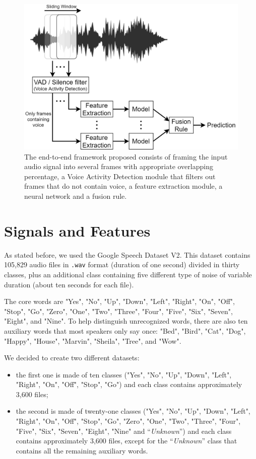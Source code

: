 \documentclass[conference]{IEEEtran}
\begin{document}
\begin{figure}
\centering
\includegraphics[scale=0.23]{End-To-End}
\caption{The end-to-end framework proposed consists of framing the input audio signal into several frames with appropriate overlapping percentage, a Voice Activity Detection module that filters out frames that do not contain voice, a feature extraction module, a neural network and a fusion rule.}
\end{figure}

\section{Signals and Features}
As stated before, we used the Google Speech Dataset V2. This dataset contains 105,829 audio files in \texttt{.wav} format (duration of one second) divided in thirty classes, plus an additional class containing five different type of noise of variable duration (about ten seconds for each file).

The core words are "Yes", "No", "Up", "Down", "Left", "Right", "On", "Off", "Stop", "Go", "Zero", "One", "Two", "Three", "Four", "Five", "Six", "Seven", "Eight", and "Nine". To help distinguish unrecognized words, there are also ten auxiliary words that most speakers only say once: "Bed", "Bird", "Cat", "Dog", "Happy", "House", "Marvin", "Sheila", "Tree", and "Wow".

We decided to create two different datasets:
\begin{itemize}
\item the first one is made of ten classes ("Yes", "No", "Up", "Down", "Left", "Right", "On", "Off", "Stop", "Go") and each class contains approximately 3,600 files;
\item the second is made of twenty-one classes ("Yes", "No", "Up", "Down", "Left", "Right", "On", "Off", "Stop", "Go", "Zero", "One", "Two", "Three", "Four", "Five", "Six", "Seven", "Eight", "Nine" and “\textit{Unknown}”) and each class contains approximately 3,600 files, except for the “\textit{Unknown}” class that contains all the remaining auxiliary words.
\end{itemize}
\end{document}
